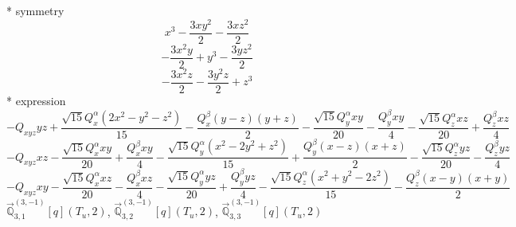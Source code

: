 \documentclass[fleqn,8pt]{jsarticle}
\begin{document}
\noindent\quad ** symmetry
\begin{dmath*}
x^{3} - \frac{3 x y^{2}}{2} - \frac{3 x z^{2}}{2}
\end{dmath*}
\begin{dmath*}
- \frac{3 x^{2} y}{2} + y^{3} - \frac{3 y z^{2}}{2}
\end{dmath*}
\begin{dmath*}
- \frac{3 x^{2} z}{2} - \frac{3 y^{2} z}{2} + z^{3}
\end{dmath*}
\noindent\quad ** expression
\begin{dmath*}
- Q_{xyz} y z + \frac{\sqrt{15} Q_{x}^{\alpha} \left(2 x^{2} - y^{2} - z^{2}\right)}{15} - \frac{Q_{x}^{\beta} \left(y - z\right) \left(y + z\right)}{2} - \frac{\sqrt{15} Q_{y}^{\alpha} x y}{20} - \frac{Q_{y}^{\beta} x y}{4} - \frac{\sqrt{15} Q_{z}^{\alpha} x z}{20} + \frac{Q_{z}^{\beta} x z}{4}
\end{dmath*}
\begin{dmath*}
- Q_{xyz} x z - \frac{\sqrt{15} Q_{x}^{\alpha} x y}{20} + \frac{Q_{x}^{\beta} x y}{4} - \frac{\sqrt{15} Q_{y}^{\alpha} \left(x^{2} - 2 y^{2} + z^{2}\right)}{15} + \frac{Q_{y}^{\beta} \left(x - z\right) \left(x + z\right)}{2} - \frac{\sqrt{15} Q_{z}^{\alpha} y z}{20} - \frac{Q_{z}^{\beta} y z}{4}
\end{dmath*}
\begin{dmath*}
- Q_{xyz} x y - \frac{\sqrt{15} Q_{x}^{\alpha} x z}{20} - \frac{Q_{x}^{\beta} x z}{4} - \frac{\sqrt{15} Q_{y}^{\alpha} y z}{20} + \frac{Q_{y}^{\beta} y z}{4} - \frac{\sqrt{15} Q_{z}^{\alpha} \left(x^{2} + y^{2} - 2 z^{2}\right)}{15} - \frac{Q_{z}^{\beta} \left(x - y\right) \left(x + y\right)}{2}
\end{dmath*}
\noindent\quad $\vec{\mathbb{Q}}_{3,1}^{(3,-1)}[q](T_{u},2)$, $\vec{\mathbb{Q}}_{3,2}^{(3,-1)}[q](T_{u},2)$, $\vec{\mathbb{Q}}_{3,3}^{(3,-1)}[q](T_{u},2)$
\end{document}
